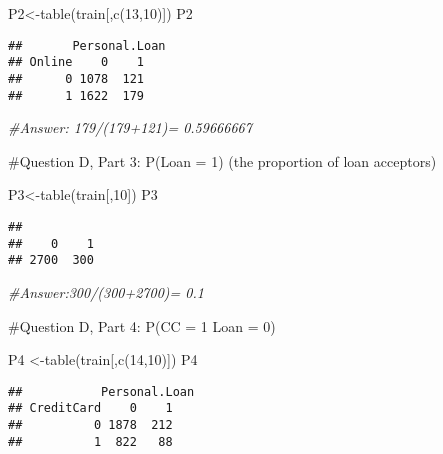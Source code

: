 \documentclass[
]{article}
\newenvironment{Shaded}{\begin{snugshade}}{\end{snugshade}}
\newcommand{\CommentTok}[1]{\textcolor[rgb]{0.56,0.35,0.01}{\textit{#1}}}
\newcommand{\DecValTok}[1]{\textcolor[rgb]{0.00,0.00,0.81}{#1}}
\newcommand{\FunctionTok}[1]{\textcolor[rgb]{0.00,0.00,0.00}{#1}}
\newcommand{\NormalTok}[1]{#1}
\newcommand{\OtherTok}[1]{\textcolor[rgb]{0.56,0.35,0.01}{#1}}
\begin{document}
\begin{Shaded}
\begin{Highlighting}[]
\NormalTok{P2}\OtherTok{\textless{}{-}}\FunctionTok{table}\NormalTok{(train[,}\FunctionTok{c}\NormalTok{(}\DecValTok{13}\NormalTok{,}\DecValTok{10}\NormalTok{)])}
\NormalTok{P2}
\end{Highlighting}
\end{Shaded}

\begin{verbatim}
##       Personal.Loan
## Online    0    1
##      0 1078  121
##      1 1622  179
\end{verbatim}

\begin{Shaded}
\begin{Highlighting}[]
\CommentTok{\#Answer: 179/(179+121)= 0.59666667}
\end{Highlighting}
\end{Shaded}

\#Question D, Part 3: P(Loan = 1) (the proportion of loan acceptors)

\begin{Shaded}
\begin{Highlighting}[]
\NormalTok{P3}\OtherTok{\textless{}{-}}\FunctionTok{table}\NormalTok{(train[,}\DecValTok{10}\NormalTok{])}
\NormalTok{P3}
\end{Highlighting}
\end{Shaded}

\begin{verbatim}
## 
##    0    1 
## 2700  300
\end{verbatim}

\begin{Shaded}
\begin{Highlighting}[]
\CommentTok{\#Answer:300/(300+2700)= 0.1}
\end{Highlighting}
\end{Shaded}

\#Question D, Part 4: P(CC = 1 \textbar{} Loan = 0)

\begin{Shaded}
\begin{Highlighting}[]
\NormalTok{P4 }\OtherTok{\textless{}{-}}\FunctionTok{table}\NormalTok{(train[,}\FunctionTok{c}\NormalTok{(}\DecValTok{14}\NormalTok{,}\DecValTok{10}\NormalTok{)])}
\NormalTok{P4}
\end{Highlighting}
\end{Shaded}

\begin{verbatim}
##           Personal.Loan
## CreditCard    0    1
##          0 1878  212
##          1  822   88
\end{verbatim}
\end{document}
